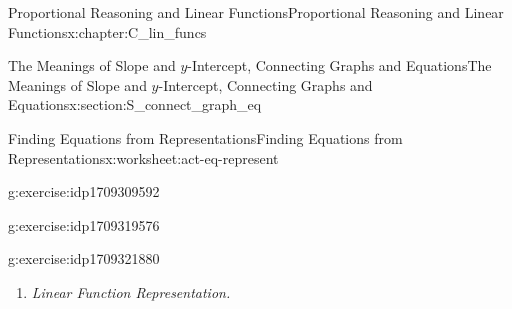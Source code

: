 \documentclass[oneside,10pt,]{book}
\newlength{\fillinmaxwidth}
\newlength{\fillincontract}
\newlength{\fillinheight}
\newcommand{\fillintext}[1]{%
\setlength{\fillinmaxwidth}{#1em*\real{0.5}}%
\setlength{\fillincontract}{#1em*\real{0.5}*\real{0.2}}%
\setlength{\fillinheight}{\heightof{\strut}+1.2pt}%
\strut\nobreak\leaders\vbox{\hrule width 0.3pt height 0.3pt \vskip -1.2pt}\hskip 1\fillinmaxwidth minus \fillincontract\nobreak\strut%
}
\newcommand{\lititle}[1]{{\slshape#1}}
\numberwithin{equation}{chapter}
\begin{document}
\begin{chapterptx}{Proportional Reasoning and Linear Functions}{}{Proportional Reasoning and Linear Functions}{}{}{x:chapter:C_lin_funcs}
\begin{sectionptx}{The Meanings of Slope and \(y\)-Intercept, Connecting Graphs and Equations}{}{The Meanings of Slope and \(y\)-Intercept, Connecting Graphs and Equations}{}{}{x:section:S_connect_graph_eq}
\begin{worksheet-subsection}{Finding Equations from Representations}{}{Finding Equations from Representations}{}{}{x:worksheet:act-eq-represent}
\begin{divisionexercise}{2}{}{}{g:exercise:idp1709309592}
\end{divisionexercise}%
\begin{divisionexercise}{3}{}{}{g:exercise:idp1709319576}%
\end{divisionexercise}%
\begin{divisionexercise}{4}{}{}{g:exercise:idp1709321880}%
\begin{enumerate}[font=\bfseries,label=(\alph*),ref=\alph*]
\item{}\lititle{Linear Function Representation.}\par%
\begin{image}{0.2}{0.6}{0.2}%

\end{image}
\end{enumerate}
\end{divisionexercise}
\end{worksheet-subsection}
\end{sectionptx}
\end{chapterptx}
\end{document}
